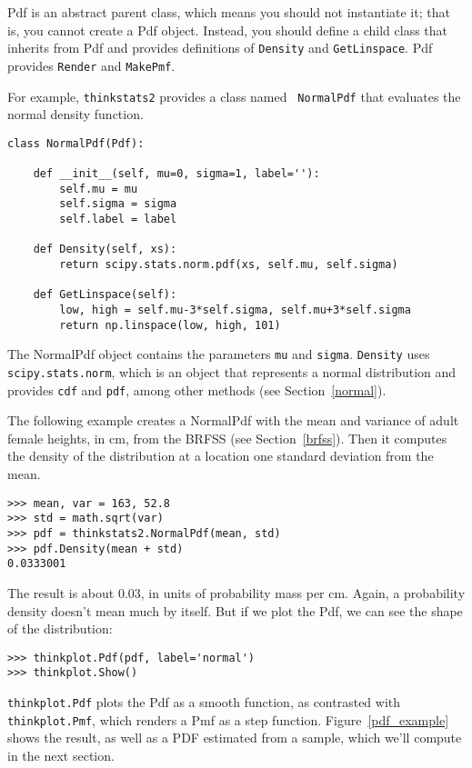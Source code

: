 \documentclass[12pt]{book}
\begin{document}
Pdf is an abstract parent class, which means you should not
instantiate it; that is, you cannot create a Pdf object.  Instead, you
should define a child class that inherits from Pdf and provides
definitions of {\tt Density} and {\tt GetLinspace}.  Pdf provides
{\tt Render} and {\tt MakePmf}.

For example, {\tt thinkstats2} provides a class named {\tt
  NormalPdf} that evaluates the normal density function.

\begin{verbatim}
class NormalPdf(Pdf):

    def __init__(self, mu=0, sigma=1, label=''):
        self.mu = mu
        self.sigma = sigma
        self.label = label

    def Density(self, xs):
        return scipy.stats.norm.pdf(xs, self.mu, self.sigma)

    def GetLinspace(self):
        low, high = self.mu-3*self.sigma, self.mu+3*self.sigma
        return np.linspace(low, high, 101)
\end{verbatim}

The NormalPdf object contains the parameters {\tt mu} and
{\tt sigma}.  {\tt Density} uses
{\tt scipy.stats.norm}, which is an object that represents a normal
distribution and provides {\tt cdf} and {\tt pdf}, among other
methods (see Section~\ref{normal}).

The following example creates a NormalPdf with the mean and variance
of adult female heights, in cm, from the BRFSS (see
Section~\ref{brfss}).  Then it computes the density of the
distribution at a location one standard deviation from the mean.

\begin{verbatim}
>>> mean, var = 163, 52.8
>>> std = math.sqrt(var)
>>> pdf = thinkstats2.NormalPdf(mean, std)
>>> pdf.Density(mean + std)
0.0333001
\end{verbatim}

The result is about 0.03, in units of probability mass per cm.
Again, a probability density doesn't mean much by itself.  But if
we plot the Pdf, we can see the shape of the distribution:

\begin{verbatim}
>>> thinkplot.Pdf(pdf, label='normal')
>>> thinkplot.Show()
\end{verbatim}

{\tt thinkplot.Pdf} plots the Pdf as a smooth function,
as contrasted with {\tt thinkplot.Pmf}, which renders a Pmf as a
step function.  Figure~\ref{pdf_example} shows the result, as well
as a PDF estimated from a sample, which we'll compute in the next
section.
\end{document}
